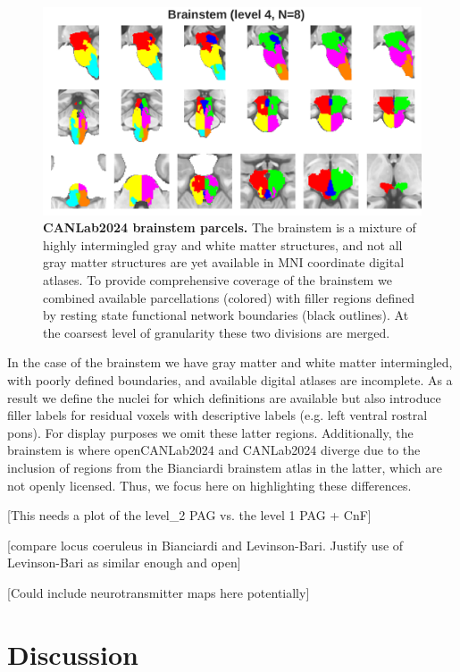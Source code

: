 \documentclass[10pt,letterpaper]{article}
\begin{document}
\begin{figure}[t]
\begin{minipage}{\linewidth}
\end{minipage}
\begin{minipage}{\linewidth}
\includegraphics[width=\linewidth]{images/bstem_coarsest.png}
\end{minipage}
\caption{
{\bf
CANLab2024 brainstem parcels.} The brainstem is a mixture of highly intermingled gray and white matter structures, and not all gray matter structures are yet available in MNI coordinate digital atlases. To provide comprehensive coverage of the brainstem we combined available parcellations (colored) with filler regions defined by resting state functional network boundaries (black outlines). At the coarsest level of granularity these two divisions are merged.
}
\label{brainstem-granularities-figure}
\end{figure}

In the case of the brainstem we have gray matter and white matter intermingled, with poorly defined boundaries, and available digital atlases are incomplete. As a result we define the nuclei for which definitions are available but also introduce filler labels for residual voxels with descriptive labels (e.g. left ventral rostral pons). For display purposes we omit these latter regions. Additionally, the brainstem is where openCANLab2024 and CANLab2024 diverge due to the inclusion of regions from the Bianciardi brainstem atlas in the latter, which are not openly licensed. Thus, we focus here on highlighting these differences.

[This needs a plot of the level\_2 PAG vs. the level 1 PAG + CnF]

[compare locus coeruleus in Bianciardi and Levinson-Bari. Justify use of Levinson-Bari as similar enough and open]

[Could include neurotransmitter maps here potentially]


\section{Discussion}
\end{document}
